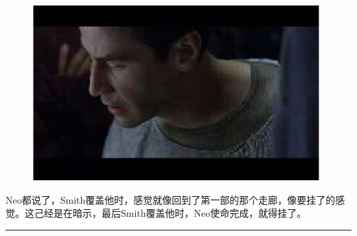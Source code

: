 \documentclass{ctexart}
\newcommand{\myparsep}{\noindent \rule[0.5ex]{\linewidth}{1pt}}
\begin{document}
\begin{figure}[htb]
\centering
\includegraphics[width=0.5\linewidth]{fig/read_reloaded-83}
\end{figure}

Neo都说了，Smith覆盖他时，感觉就像回到了第一部的那个走廊，像要挂了的感觉。这己经是在暗示，最后Smith覆盖他时，Neo使命完成，就得挂了。

\myparsep
\end{document}
